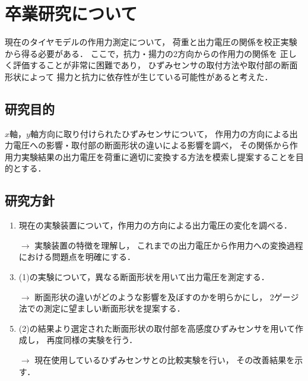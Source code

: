 \documentclass[twocolumn,a4j]{jsarticle}
\begin{document}
\newpage

\section{卒業研究について}

現在のタイヤモデルの作用力測定について，
荷重と出力電圧の関係を校正実験から得る必要がある．
ここで，抗力・揚力の2方向からの作用力の関係を
正しく評価することが非常に困難であり，
ひずみセンサの取付方法や取付部の断面形状によって
揚力と抗力に依存性が生じている可能性があると考えた．\\

\subsection{研究目的}
$x$軸，$y$軸方向に取り付けられたひずみセンサについて，
作用力の方向による出力電圧への影響・取付部の断面形状の違いによる影響を調べ，
その関係から作用力実験結果の出力電圧を荷重に適切に変換する方法を模索し提案することを目的とする．\\

\subsection{研究方針}
\begin{enumerate}[(1)]
    \item 現在の実験装置について，作用力の方向による出力電圧の変化を調べる．
    \item [$\rightarrow$] 実験装置の特徴を理解し，
          これまでの出力電圧から作用力への変換過程における問題点を明確にする．
    \item (1)の実験について，異なる断面形状を用いて出力電圧を測定する．
    \item [$\rightarrow$] 断面形状の違いがどのような影響を及ぼすのかを明らかにし，
          2ゲージ法での測定に望ましい断面形状を提案する．
    \item (2)の結果より選定された断面形状の取付部を高感度ひずみセンサを用いて作成し，
          再度同様の実験を行う．
    \item [$\rightarrow$] 現在使用しているひずみセンサとの比較実験を行い，
          その改善結果を示す．
\end{enumerate}
\end{document}
